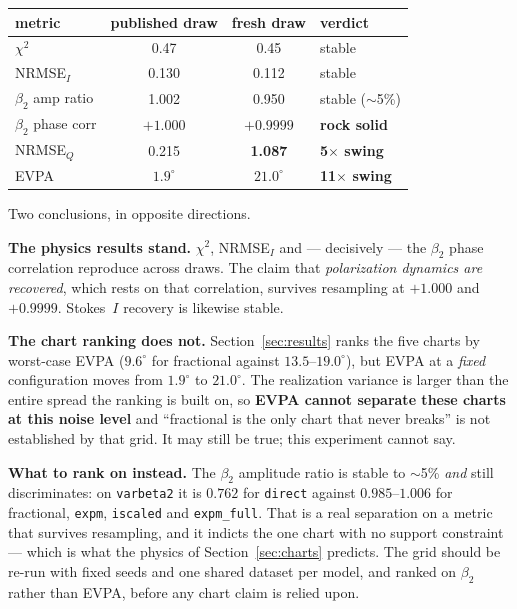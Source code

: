 \documentclass[11pt]{article}
\begin{document}
\begin{center}
\begin{tabular}{@{}lccl@{}}
\toprule
metric & published draw & fresh draw & verdict \\
\midrule
$\chi^2$              & 0.47  & 0.45   & stable \\
NRMSE$_I$             & 0.130 & 0.112  & stable \\
$\beta_2$ amp ratio   & 1.002 & 0.950  & stable ($\sim$5\%) \\
$\beta_2$ phase corr  & $+1.000$ & $+0.9999$ & \textbf{rock solid} \\
NRMSE$_Q$             & 0.215 & \textbf{1.087} & \textbf{5$\times$ swing} \\
EVPA                  & $1.9^\circ$ & $\mathbf{21.0^\circ}$ & \textbf{11$\times$ swing} \\
\bottomrule
\end{tabular}
\end{center}

Two conclusions, in opposite directions.

\textbf{The physics results stand.} $\chi^2$, NRMSE$_I$ and --- decisively --- the
$\beta_2$ phase correlation reproduce across draws. The claim that \emph{polarization
dynamics are recovered}, which rests on that correlation, survives resampling at
$+1.000$ and $+0.9999$. Stokes~$I$ recovery is likewise stable.

\textbf{The chart ranking does not.} Section~\ref{sec:results} ranks the five charts by
worst-case EVPA ($9.6^\circ$ for fractional against $13.5$--$19.0^\circ$), but EVPA at
a \emph{fixed} configuration moves from $1.9^\circ$ to $21.0^\circ$. The realization
variance is larger than the entire spread the ranking is built on, so \textbf{EVPA
cannot separate these charts at this noise level} and ``fractional is the only chart
that never breaks'' is not established by that grid. It may still be true; this
experiment cannot say.

\textbf{What to rank on instead.} The $\beta_2$ amplitude ratio is stable to $\sim$5\%
\emph{and} still discriminates: on \texttt{varbeta2} it is $0.762$ for \texttt{direct}
against $0.985$--$1.006$ for fractional, \texttt{expm}, \texttt{iscaled} and
\texttt{expm\_full}. That is a real separation on a metric that survives resampling,
and it indicts the one chart with no support constraint --- which is what the physics
of Section~\ref{sec:charts} predicts. The grid should be re-run with fixed seeds and
one shared dataset per model, and ranked on $\beta_2$ rather than EVPA, before any
chart claim is relied upon.
\end{document}
